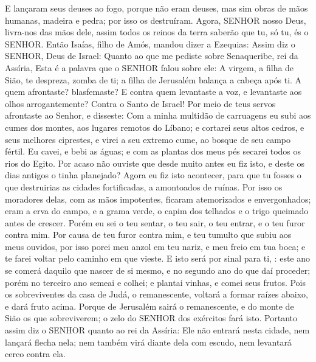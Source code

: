 {  E lançaram seus deuses ao fogo, porque não eram deuses, mas sim obras de mãos humanas, madeira e pedra; por isso os destruíram.
  Agora, SENHOR nosso Deus, livra-nos das mãos dele,
{} assim todos os reinos da terra saberão que tu, só tu, és o SENHOR.
  Então Isaías, filho de Amós, mandou dizer a Ezequias: Assim diz o SENHOR, Deus de Israel: Quanto ao que me pediste sobre Senaqueribe, rei da Assíria,
  Esta é a palavra que o SENHOR falou sobre ele: A virgem, a filha de Sião, te despreza, zomba de ti; a filha de Jerusalém balança a cabeça após ti.
  A quem afrontaste?
{} blasfemaste? E contra quem levantaste a voz, e levantaste aos olhos arrogantemente? Contra o Santo de Israel!
  Por meio de teus servos afrontaste ao Senhor, e disseste: Com a minha multidão de carruagens eu subi aos cumes dos montes, aos lugares remotos do Líbano; e cortarei seus altos cedros, e seus melhores ciprestes,
 e virei a seu extremo cume, ao bosque de seu campo fértil.
  Eu cavei, e bebi as águas; e com as plantas dos meus pés secarei todos os rios do Egito.
  Por acaso não ouviste que desde muito antes eu fiz isto, e deste os dias antigos o tinha planejado? Agora eu fiz isto acontecer, para que tu fosses o que destruirias as cidades fortificadas,
{} a amontoados de ruínas.
  Por isso os moradores delas, com as mãos impotentes, ficaram atemorizados e envergonhados; eram
{} a erva do campo, e a grama verde, o capim dos telhados e o trigo queimado antes de crescer.
  Porém eu sei o teu sentar, o teu sair, o teu entrar, e o teu furor contra mim.
  Por causa de teu furor contra mim, e teu tumulto
 que subiu aos meus ouvidos, por isso porei meu anzol em teu nariz, e meu freio em tua boca; e te farei voltar pelo caminho em que vieste.
  E isto será por sinal para ti,
{} : este ano se comerá daquilo que nascer de si mesmo, e no segundo ano do que daí proceder; porém no terceiro ano semeai e colhei; e plantai vinhas, e comei seus frutos.
  Pois os sobreviventes da casa de Judá, o remanescente, voltará a formar raízes abaixo, e dará fruto acima.
  Porque de Jerusalém sairá o remanescente, e do monte de Sião os que sobreviverem; o zelo do SENHOR dos exércitos fará isto.
  Portanto assim diz o SENHOR quanto ao rei da Assíria: Ele não entrará nesta cidade, nem lançará flecha nela; nem também virá diante dela com escudo, nem levantará cerco contra ela.
}
